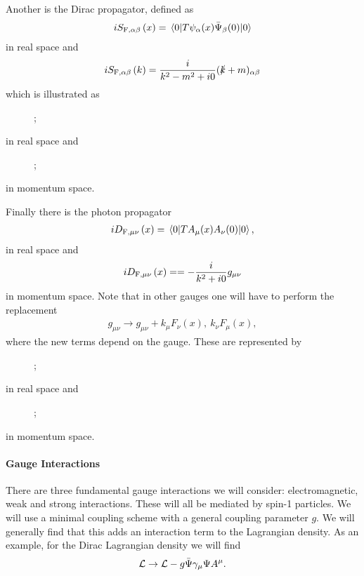 Another is the Dirac propagator, defined as
\begin{align*}
	iS_{\text{F}, \alpha\beta}\left(x\right) = \expval{\ensuremath{T}{\psi_{\alpha}(x)}{\bar{\Psi}_{\beta}(0)}}{0}
\end{align*}
in real space and
\begin{align*}
	iS_{\text{F}, \alpha\beta}\left(k\right) = \frac{i}{k^{2} - m^{2} + i0}(\slashed{k} + m)_{\alpha\beta}
\end{align*}
which is illustrated as
\begin{figure}[!ht]
	\centering
	;
\end{figure}
in real space and
\begin{figure}[!ht]
	\centering
	;
\end{figure}
in momentum space.

Finally there is the photon propagator
\begin{align*}
	iD_{\text{F}, \mu\nu}\left(x\right) = \expval{\ensuremath{T}{A_{\mu}(x)}{A_{\nu}(0)}}{0},
\end{align*}
in real space and
\begin{align}
	iD_{\text{F}, \mu\nu}\left(x\right) = = -\frac{i}{k^{2} + i0}g_{\mu\nu}
\end{align}
in momentum space. Note that in other gauges one will have to perform the replacement
\begin{align*}
	g_{\mu\nu} \to g_{\mu\nu} + k_{\mu}F_{\nu}(x),\ k_{\nu}F_{\mu}(x),
\end{align*}
where the new terms depend on the gauge. These are represented by
\begin{figure}[!ht]
	\centering
	;
\end{figure}
in real space and
\begin{figure}[!ht]
	\centering
	;
\end{figure}
in momentum space.

\paragraph{Gauge Interactions}
There are three fundamental gauge interactions we will consider: electromagnetic, weak and strong interactions. These will all be mediated by spin-1 particles. We will use a minimal coupling scheme with a general coupling parameter $g$. We will generally find that this adds an interaction term to the Lagrangian density. As an example, for the Dirac Lagrangian density we will find
\begin{align*}
	\mathcal{L} \to \mathcal{L} - g\bar{\Psi}\gamma_{\mu}\Psi A^{\mu}.
\end{align*}

